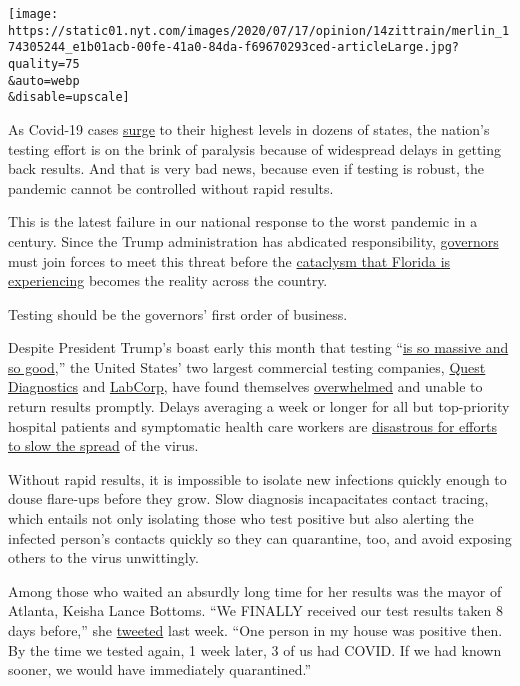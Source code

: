 \texttt{[image: https://static01.nyt.com/images/2020/07/17/opinion/14zittrain/merlin\_174305244\_e1b01acb-00fe-41a0-84da-f69670293ced-articleLarge.jpg?quality=75\\\&auto=webp\\\&disable=upscale]}

As Covid-19 cases
\href{https://coronavirus.jhu.edu/data/new-cases-50-states}{surge} to
their highest levels in dozens of states, the nation's testing effort is
on the brink of paralysis because of widespread delays in getting back
results. And that is very bad news, because even if testing is robust,
the pandemic cannot be controlled without rapid results.

This is the latest failure in our national response to the worst
pandemic in a century. Since the Trump administration has abdicated
responsibility,
\href{https://www.nytimes.com/2020/07/13/us/coronavirus-governors.html}{governors}
must join forces to meet this threat before the
\href{https://perma.cc/UW3Q-9M2X}{cataclysm that Florida is
experiencing} becomes the reality across the country.

Testing should be the governors' first order of business.

Despite President Trump's boast early this month that testing
``\href{https://twitter.com/realDonaldTrump/status/1278897430378041344}{is
so massive and so good},'' the United States' two largest commercial
testing companies,
\href{https://newsroom.questdiagnostics.com/COVIDTestingUpdates}{Quest
Diagnostics} and
\href{https://www.labcorp.com/coronavirus-disease-covid-19/labcorp-newsroom}{LabCorp},
have found themselves
\href{https://www.cnbc.com/2020/07/13/us-coronavirus-surge-leads-to-testing-delays-across-the-nation-quest-diagnostics-says.html}{overwhelmed}
and unable to return results promptly. Delays averaging a week or longer
for all but top-priority hospital patients and symptomatic health care
workers are
\href{https://science.sciencemag.org/content/368/6491/eabb6936}{disastrous
for efforts to slow the spread} of the virus.

Without rapid results, it is impossible to isolate new infections
quickly enough to douse flare-ups before they grow. Slow diagnosis
incapacitates contact tracing, which entails not only isolating those
who test positive but also alerting the infected person's contacts
quickly so they can quarantine, too, and avoid exposing others to the
virus unwittingly.

Among those who waited an absurdly long time for her results was the
mayor of Atlanta, Keisha Lance Bottoms. ``We FINALLY received our test
results taken 8 days before,'' she
\href{https://twitter.com/KeishaBottoms/status/1280824621214896129?s=20}{tweeted}
last week. ``One person in my house was positive then. By the time we
tested again, 1 week later, 3 of us had COVID. If we had known sooner,
we would have immediately quarantined.''

